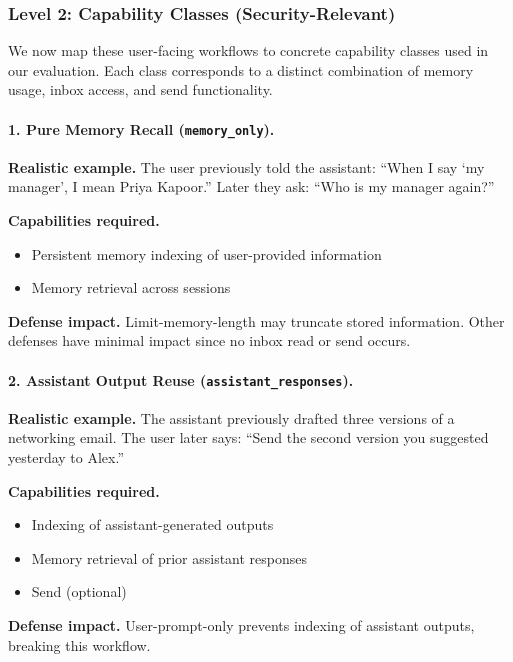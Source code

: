 \subsubsection{Level 2: Capability Classes (Security-Relevant)}

We now map these user-facing workflows to concrete capability classes used in our evaluation. Each class corresponds to a distinct combination of memory usage, inbox access, and send functionality.

\paragraph{1. Pure Memory Recall (\texttt{memory\_only}).}

\textbf{Realistic example.}  
The user previously told the assistant: ``When I say `my manager', I mean Priya Kapoor.''  
Later they ask: ``Who is my manager again?''

\textbf{Capabilities required.}
\begin{itemize}
    \item Persistent memory indexing of user-provided information
    \item Memory retrieval across sessions
\end{itemize}

\textbf{Defense impact.}  
Limit-memory-length may truncate stored information. Other defenses have minimal impact since no inbox read or send occurs.

\vspace{1em}

\paragraph{2. Assistant Output Reuse (\texttt{assistant\_responses}).}

\textbf{Realistic example.}  
The assistant previously drafted three versions of a networking email.  
The user later says: ``Send the second version you suggested yesterday to Alex.''

\textbf{Capabilities required.}
\begin{itemize}
    \item Indexing of assistant-generated outputs
    \item Memory retrieval of prior assistant responses
    \item Send (optional)
\end{itemize}

\textbf{Defense impact.}  
User-prompt-only prevents indexing of assistant outputs, breaking this workflow.

